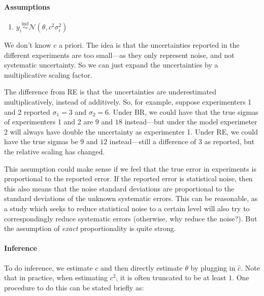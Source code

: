 \documentclass[letterpaper,12pt]{article}
\begin{document}
\paragraph{Assumptions}\label{assumptions-2}

\begin{enumerate}
\item
  $y_i\overset{\mathrm{ind}}{\sim}\mathcal{N}(\theta,c^2\sigma_i^2)$
\end{enumerate}

We don't know $c$ a priori. The idea is that the uncertainties reported in the different experiments are too small---as they only represent noise, and not systematic uncertainty. So we can just expand the uncertainties by a multiplicative scaling factor.

The difference from RE is that the uncertainties are underestimated multiplicatively, instead of additively. So, for example, suppose experimenters 1 and 2 reported $\sigma_1=3$ and $\sigma_2=6$. Under BR, we could have that the true sigmas of experimenters 1 and 2 are $9$ and $18$ instead---but under the model experimeter 2 will always have double the uncertainty as experimenter 1. Under RE, we could have the true sigmas be $9$ and $12$ instead---still a difference of 3 as reported, but the relative scaling has changed.

This assumption could make sense if we feel that the true error in experiments is proportional to the reported error. If the reported error is statistical noise, then this also means that the noise standard deviations are proportional to the standard deviations of the unknown systematic errors. This can be reasonable, as a study which seeks to reduce statistical noise to a certain level will also try to correspondingly reduce systematic errors (otherwise, why reduce the noise?). But the assumption of \emph{exact} proportionality is quite strong.

\paragraph{Inference}

To do inference, we estimate $c$ and then directly estimate $\theta$ by plugging in $\hat c$. Note that in practice, when estimating $c^2$, it is often truncated to be at least $1$. One procedure to do this can be stated briefly as:
\end{document}
